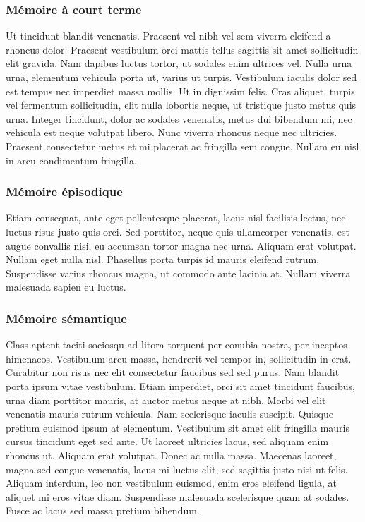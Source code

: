 \subsubsection{Mémoire à court terme}

Ut tincidunt blandit venenatis. Praesent vel nibh vel sem viverra eleifend a rhoncus dolor. Praesent vestibulum orci mattis tellus sagittis sit amet sollicitudin elit gravida. Nam dapibus luctus tortor, ut sodales enim ultrices vel. Nulla urna urna, elementum vehicula porta ut, varius ut turpis. Vestibulum iaculis dolor sed est tempus nec imperdiet massa mollis. Ut in dignissim felis. Cras aliquet, turpis vel fermentum sollicitudin, elit nulla lobortis neque, ut tristique justo metus quis urna. Integer tincidunt, dolor ac sodales venenatis, metus dui bibendum mi, nec vehicula est neque volutpat libero. Nunc viverra rhoncus neque nec ultricies. Praesent consectetur metus et mi placerat ac fringilla sem congue. Nullam eu nisl in arcu condimentum fringilla. 

\subsubsection{Mémoire épisodique}

Etiam consequat, ante eget pellentesque placerat, lacus nisl facilisis lectus, nec luctus risus justo quis orci. Sed porttitor, neque quis ullamcorper venenatis, est augue convallis nisi, eu accumsan tortor magna nec urna. Aliquam erat volutpat. Nullam eget nulla nisl. Phasellus porta turpis id mauris eleifend rutrum. Suspendisse varius rhoncus magna, ut commodo ante lacinia at. Nullam viverra malesuada sapien eu luctus. 

\subsubsection{Mémoire sémantique}

Class aptent taciti sociosqu ad litora torquent per conubia nostra, per inceptos himenaeos. Vestibulum arcu massa, hendrerit vel tempor in, sollicitudin in erat. Curabitur non risus nec elit consectetur faucibus sed sed purus. Nam blandit porta ipsum vitae vestibulum. Etiam imperdiet, orci sit amet tincidunt faucibus, urna diam porttitor mauris, at auctor metus neque at nibh. Morbi vel elit venenatis mauris rutrum vehicula. Nam scelerisque iaculis suscipit. Quisque pretium euismod ipsum at elementum. Vestibulum sit amet elit fringilla mauris cursus tincidunt eget sed ante. Ut laoreet ultricies lacus, sed aliquam enim rhoncus ut. Aliquam erat volutpat. Donec ac nulla massa. Maecenas laoreet, magna sed congue venenatis, lacus mi luctus elit, sed sagittis justo nisi ut felis. Aliquam interdum, leo non vestibulum euismod, enim eros eleifend ligula, at aliquet mi eros vitae diam. Suspendisse malesuada scelerisque quam at sodales. Fusce ac lacus sed massa pretium bibendum. 

